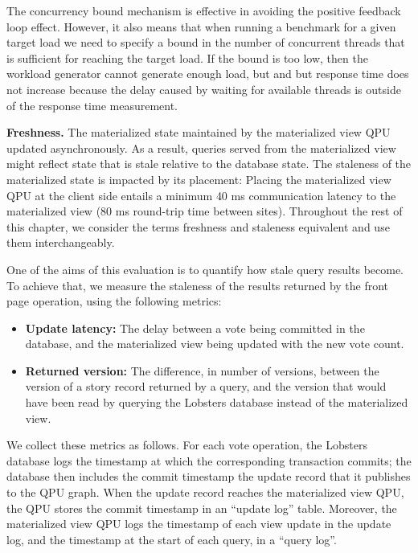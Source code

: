 The concurrency bound mechanism is effective in avoiding the positive feedback loop effect.
However, it also means that when running a benchmark for a given target load we need to specify a bound in the number of
concurrent threads that is sufficient for reaching the target load.
If the bound is too low, then the workload generator cannot generate enough load, but and but response time does not
increase because the delay caused by waiting for available threads is outside of the response time measurement.

\bigskip
\noindent
\textbf{Freshness.} The materialized state maintained by the materialized view QPU updated asynchronously.
As a result, queries served from the materialized view might reflect state that is stale relative to the database state.
The staleness of the materialized state is impacted by its placement:
Placing the materialized view QPU at the client side entails a minimum 40 ms communication latency to the materialized view
(80 ms round-trip time between sites).
Throughout the rest of this chapter, we consider the terms freshness and staleness equivalent and use them interchangeably.

One of the aims of this evaluation is to quantify how stale query results become.
To achieve that, we measure the staleness of the results returned by the front page operation,
using the following metrics:
\begin{itemize}
  \item \textbf{Update latency:} The delay between a vote being committed in the database, and the materialized view being
  updated with the new vote count.
  \item \textbf{Returned version:} The difference, in number of versions, between the version of a story record returned by a query,
  and the version that would have been read by querying the Lobsters database instead of the materialized view.
\end{itemize}

We collect these metrics as follows.
For each vote operation, the Lobsters database logs the timestamp at which the corresponding transaction commits;
the database then includes the commit timestamp the update record that it publishes to the QPU graph.
When the update record reaches the materialized view QPU, the QPU stores the commit timestamp in an
``update log'' table.
Moreover, the materialized view QPU logs the timestamp of each view update in the update log,
and the timestamp at the start of each query, in a ``query log''.

